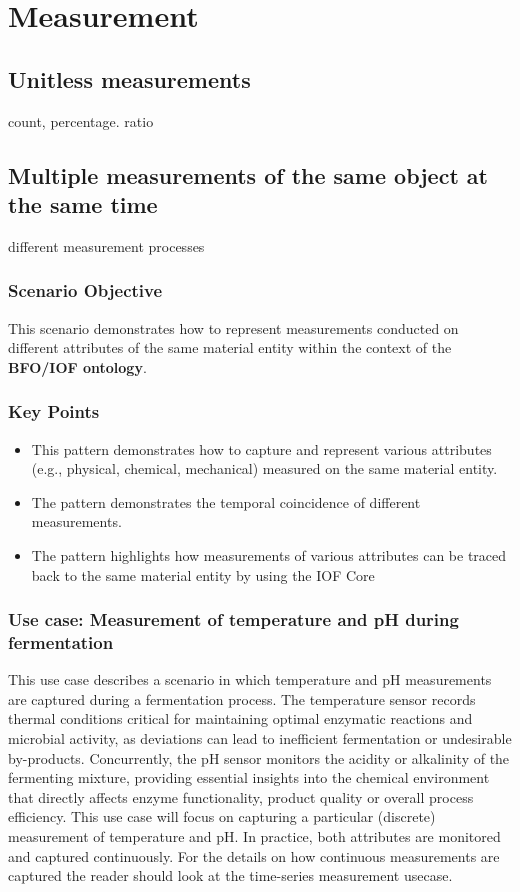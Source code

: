 \chapter{Measurement}


\section{Unitless measurements}
count, percentage. ratio

\section{Multiple measurements of the same object at the same time}
different measurement processes 

\subsection*{Scenario Objective}

This scenario demonstrates how to represent measurements conducted on different attributes of the same material entity within the context of the \textbf{BFO/IOF ontology}.

\subsection*{Key Points}
\begin{itemize}
    \item This pattern demonstrates how to capture and represent various attributes (e.g., physical, chemical, mechanical) measured on the same material entity.
    \item The pattern demonstrates the temporal coincidence of different measurements.
     \item The pattern highlights how measurements of various attributes can be traced back to the same material entity by using the IOF Core
\end{itemize}
\subsection{Use case: Measurement of temperature and pH during fermentation}
This use case describes a scenario in which temperature and pH measurements are captured during a fermentation process. The temperature sensor records thermal conditions critical for maintaining optimal enzymatic reactions and microbial activity, as deviations can lead to inefficient fermentation or undesirable by-products. Concurrently, the pH sensor monitors the acidity or alkalinity of the fermenting mixture, providing essential insights into the chemical environment that directly affects enzyme functionality, product quality or overall process efficiency.
This use case will focus on capturing a particular (discrete) measurement of temperature and pH. In practice, both attributes are monitored and captured continuously. For the details on how continuous measurements are captured the reader should look at the time-series measurement usecase.

